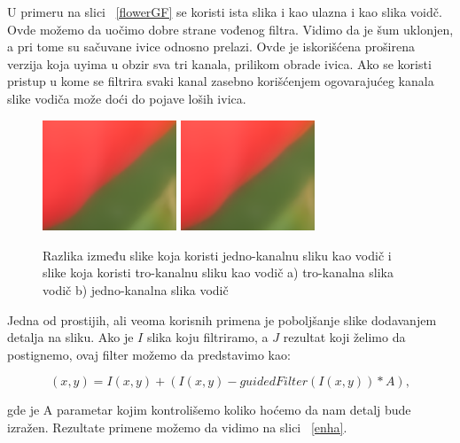\documentclass[a4paper,12pt,titlepage]{article}
\begin{document}
U primeru na slici ~\ref{flowerGF} se koristi ista slika i kao ulazna i kao slika voidč. Ovde možemo da uočimo dobre strane vođenog filtra. Vidimo da je šum uklonjen, a pri tome su sačuvane ivice odnosno prelazi. Ovde je iskorišćena proširena verzija koja uyima u obzir sva tri kanala, prilikom obrade ivica. Ako se koristi pristup u kome se filtrira svaki kanal zasebno korišćenjem ogovarajućeg kanala slike vodiča može doći do pojave loših ivica. 

\begin{figure}[ht!]
\centering
\includegraphics[width=40mm]{img/zoom1.png}
\includegraphics[width=40mm]{img/zoom2.png}
\caption{Razlika između slike koja koristi jedno-kanalnu sliku kao vodič i slike koja koristi tro-kanalnu sliku kao vodič a) tro-kanalna slika vodič b) jedno-kanalna slika vodič }
\label{overflow}
\end{figure}

Jedna od prostijih, ali veoma korisnih primena je poboljšanje slike dodavanjem detalja na sliku. Ako je $I$ slika koju filtriramo, a $J$ rezultat koji želimo da postignemo, ovaj filter možemo da predstavimo kao:

\begin{equation}\label{eq:enh}
(x, y) = I(x, y) + (I(x, y) - guidedFilter(I(x, y)) * A),
\end{equation}

gde je A parametar kojim kontrolišemo koliko hoćemo da nam detalj bude izražen. Rezultate primene možemo da vidimo na slici ~\ref{enha}.
\end{document}
